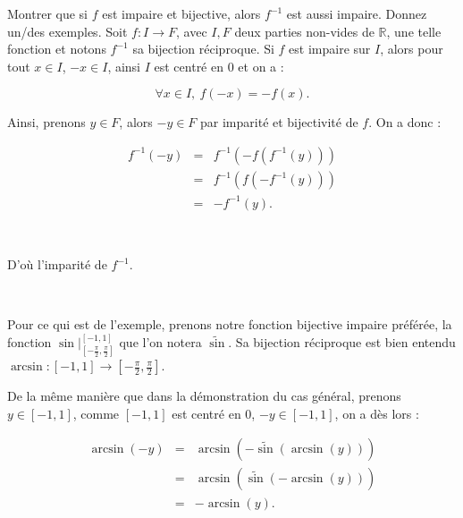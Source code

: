\documentclass{article}
\renewenvironment{question_kholle}[2][ ]
{
	\subsection{\texorpdfstring{#2}{}}
	\notblank{#1}
	{
		\noindent #1
		\bigbreak
	}
	{}
	\begin{proof}
}
{
	\end{proof}
}
\begin{document}
\begin{question_kholle}{Montrer que si $f$ est impaire et bijective, alors $f^{-1}$ est aussi impaire. Donnez un/des exemples.}
	Soit $f: I \to F$, avec $I,F$ deux parties non-vides de $\mathbb{R}$, une telle fonction et notons $f^{-1}$ sa bijection réciproque. Si $f$ est impaire sur $I$, alors pour tout $x\in I$, $-x\in I$, ainsi $I$ est centré en $0$ et on a :

	\begin{equation*}
		\forall x \in I, \ f(-x) = -f(x).
	\end{equation*}

	Ainsi, prenons $y\in F$, alors $-y \in F$ par imparité et bijectivité de $f$. On a donc :

	\begin{eqnarray*}
		f^{-1}(-y) & = & f^{-1}(-f(f^{-1}(y))) \\
		& = & f^{-1}(f(-f^{-1}(y))) \\
		& = & -f^{-1}(y).
	\end{eqnarray*}

	\

	D'où l'imparité de $f^{-1}$.

	\

	Pour ce qui est de l'exemple, prenons notre fonction bijective impaire préférée, la fonction $\textstyle \sin |_{\left[ -\frac{\pi}{2}, \frac{\pi}{2}\right] }^{[-1,1]}$ que l'on notera $\widetilde{\sin}$. Sa bijection réciproque est bien entendu $\textstyle \arcsin : [-1,1] \to \left[ -\frac{\pi}{2}, \frac{\pi}{2}\right]$.

	De la même manière que dans la démonstration du cas général, prenons $y\in [-1, 1]$, comme $[-1,1]$ est centré en $0$, $-y\in [-1,1]$, on a dès lors :

	\begin{eqnarray*}
		\arcsin(-y) & = & \arcsin(-\widetilde{\sin}(\arcsin(y))) \\
		& = & \arcsin(\widetilde{\sin}(-\arcsin(y))) \\
		& = & -\arcsin(y).
	\end{eqnarray*}
\end{question_kholle}
\end{document}
